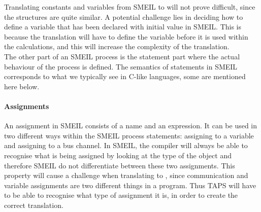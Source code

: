 Translating constants and variables from SMEIL to \cspm will not prove difficult, since the structures are quite similar.
A potential challenge lies in deciding how to define a variable that has been declared with initial value in SMEIL. This is because the \cspm translation will have to define the variable before it is used within the calculations, and this will increase the complexity of the translation.\\




The other part of an SMEIL process is the statement part where the actual behaviour of the process is defined. The semantics of statements in SMEIL corresponds to what we typically see in C-like languages, some are mentioned here below.
\paragraph{Assignments} %
An assignment in SMEIL consists of a name and an expression. It can be used in two different ways within the SMEIL process statements: assigning to a variable and assigning to a bus channel. In SMEIL, the compiler will always be able to recognise what is being assigned by looking at the type of the object and therefore SMEIL do not differentiate between these two assignments.
This property will cause a challenge when translating to \cspm{}, since communication and variable assignments are two different things in a \cspm program. Thus TAPS will have to be able to recognise what type of assignment it is, in order to create the correct translation.

